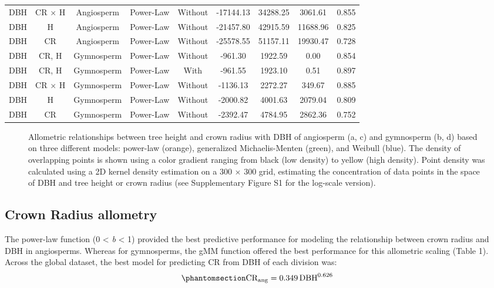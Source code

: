 \documentclass[
  12pt,
  letterpaper,
  DIV=11,
  numbers=noendperiod]{scrartcl}
\makeatletter
\newcommand*\pandocbounded[1]{%
  \sbox\pandoc@box{#1}%
  \Gscale@div\@tempa{\textheight}{\dimexpr\ht\pandoc@box+\dp\pandoc@box\relax}%
  \Gscale@div\@tempb{\linewidth}{\wd\pandoc@box}%
  \ifdim\@tempb\p@<\@tempa\p@\let\@tempa\@tempb\fi%
  \ifdim\@tempa\p@<\p@\scalebox{\@tempa}{\usebox\pandoc@box}%
  \else\usebox{\pandoc@box}%
  \fi%
}
\makeatother
\begin{document}
\begin{longtable*}[t]{ccccccccc}
DBH & CR × H & Angiosperm & Power-Law & Without & -17144.13 & 34288.25 & 3061.61 & 0.855\\
DBH & H & Angiosperm & Power-Law & Without & -21457.80 & 42915.59 & 11688.96 & 0.825\\
\addlinespace
DBH & CR & Angiosperm & Power-Law & Without & -25578.55 & 51157.11 & 19930.47 & 0.728\\
DBH & CR, H & Gymnosperm & Power-Law & Without & -961.30 & 1922.59 & 0.00 & 0.854\\
DBH & CR, H & Gymnosperm & Power-Law & With & -961.55 & 1923.10 & 0.51 & 0.897\\
DBH & CR × H & Gymnosperm & Power-Law & Without & -1136.13 & 2272.27 & 349.67 & 0.885\\
DBH & H & Gymnosperm & Power-Law & Without & -2000.82 & 4001.63 & 2079.04 & 0.809\\
\addlinespace
DBH & CR & Gymnosperm & Power-Law & Without & -2392.47 & 4784.95 & 2862.36 & 0.752\\
\bottomrule
\end{longtable*}
\endgroup{}

\newpage

\begin{figure}

\centering{

\pandocbounded{\texttt{[image: ../figs/h\_cr\_dbh\_non\_log.png]}}

}

\caption{\label{fig-compare}Allometric relationships between tree height
and crown radius with DBH of angiosperm (a, c) and gymnosperm (b, d)
based on three different models: power-law (orange), generalized
Michaelis-Menten (green), and Weibull (blue). The density of overlapping
points is shown using a color gradient ranging from black (low density)
to yellow (high density). Point density was calculated using a 2D kernel
density estimation on a 300 \(\times\) 300 grid, estimating the
concentration of data points in the space of DBH and tree height or
crown radius (see Supplementary Figure S1 for the log-scale version).}

\end{figure}%

\subsection{Crown Radius allometry}\label{crown-radius-allometry}

The power-law function (0 \textless{} \emph{b} \textless{} 1) provided
the best predictive performance for modeling the relationship between
crown radius and DBH in angiosperms. Whereas for gymnosperms, the gMM
function offered the best performance for this allometric scaling (Table
1). Across the global dataset, the best model for predicting CR from DBH
of each division was: \begin{equation}\phantomsection\label{eq-cr_ang}{
\mathrm{CR_{ang}} = \mathrm{0.349}
\, \mathrm{DBH}^{\mathrm{0.626}}
}\end{equation}
\end{document}
